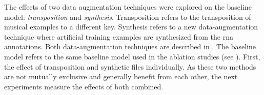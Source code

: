 
The effects of two data augmentation techniques were
explored on the baseline model: \emph{transposition} and
\emph{synthesis}. Transposition refers to the transposition
of musical examples to a different key. Synthesis refers to
a new data-augmentation technique where artificial training
examples are synthesized from the \gls{rna} annotations.
Both data-augmentation techniques are described in
. The baseline model refers to the
same baseline model used in the ablation studies (see
). First, the effect of
transposition and synthetic files individually. As these two
methods are not mutually exclusive and generally benefit
from each other, the next experiments measure the effects of
both combined. 
